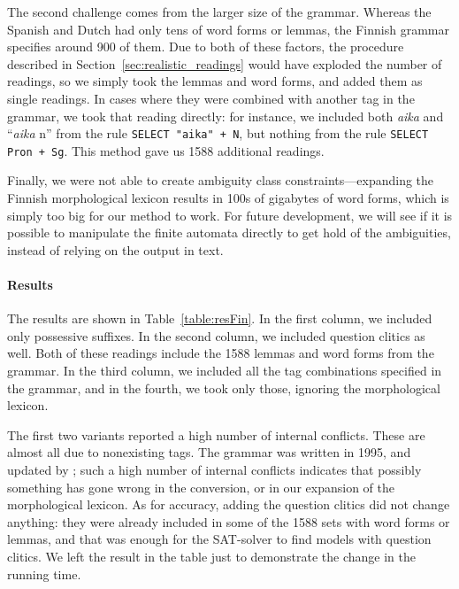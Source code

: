 The second challenge comes from the larger size of the grammar. Whereas the Spanish and Dutch had only tens of word forms or lemmas, the Finnish grammar specifies around 900 of them.
Due to both of these factors, the procedure described in Section~\ref{sec:realistic_readings} would have exploded the number of readings, so we simply took the lemmas and word forms, and added them as single readings. 
In cases where they were combined with another tag in the grammar, we took that reading directly: for instance, we included both \emph{aika} and ``\emph{aika} n'' from the rule \texttt{SELECT "aika" + N},
but nothing from the rule \texttt{SELECT Pron + Sg}. This method gave us 1588 additional readings.

Finally, we were not able to create ambiguity class constraints---expanding the Finnish morphological lexicon results in 100s of gigabytes of word forms, which is simply too big for our method to work. 
For future development, we will see if it is possible to manipulate the finite automata directly to get hold of the ambiguities, instead of relying on the output in text.


\paragraph{Results}
The results are shown in Table~\ref{table:resFin}.
In the first column, we included only possessive suffixes. In the second column, we included question clitics as well.
Both of these readings include the 1588 lemmas and word forms from the grammar.
In the third column, we included all the tag combinations specified in the grammar, and in the fourth, we took only those, ignoring the morphological lexicon.

The first two variants reported a high number of internal conflicts. 
These are almost all due to nonexisting tags. The grammar was written in 1995, and updated by ; such a high number of internal conflicts indicates that possibly something has gone wrong in the conversion, or in our expansion of the morphological lexicon.
As for accuracy, adding the question clitics did not change anything: they were already included in some of the 1588 sets with word forms or lemmas, and that was enough for the SAT-solver to find models with question clitics.
We left the result in the table just to demonstrate the change in the running time.


